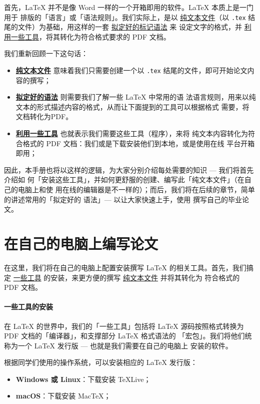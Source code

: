 首先，\LaTeX{} 并不是像 Word 一样的一个开箱即用的软件。\LaTeX{} 本质上是一门用于
排版的「语言」或「语法规则」。我们实际上，是以 \underline{纯文本文件}（以
\texttt{.tex} 结尾的文件）为基础，用这样的一套 \underline{拟定好的标记语法} 来
设定文字的格式，并 \underline{利用一些工具}，将其转化为符合格式要求的 PDF 文档。

我们重新回顾一下这句话：

\begin{itemize}[noitemsep]
  \item \textbf{\underline{纯文本文件}} 意味着我们只需要创建一个以 \texttt{.tex}
  结尾的文件，即可开始论文内容的撰写；
  \item \textbf{\underline{拟定好的语法}} 则需要我们了解一些 \LaTeX{} 中常用的语
  法语言规则，用来以纯文本的形式描述内容的格式，从而让下面提到的工具可以根据格式
  需要，将文档转化为PDF。
  \item \textbf{\underline{利用一些工具}} 也就表示我们需要这些工具（程序），来将
  纯文本内容转化为符合格式的 PDF 文档：我们或是下载安装他们到本地，或是使用在线
  平台开箱即用；
\end{itemize}

因此，本手册也将以这样的逻辑，为大家分别介绍每处需要的知识 --- 我们将首先介绍如
何「安装这些工具」，并如何更舒服的创建、编写此「纯文本文件」（在自己的电脑上和使
用在线的编辑器是不一样的）；而后，我们将在后续的章节，简单的讲述常用的「拟定好的
语法」--- 以让大家快速上手，使用 \BIThesis{} 撰写自己的毕业论文。

\section{在自己的电脑上编写论文}

在这里，我们将在自己的电脑上配置安装撰写 \LaTeX{} 的相关工具。首先，我们搞定
\underline{一些工具} 的安装，来更方便的撰写 \underline{纯文本文件} 并将其转化为
符合格式的 PDF 文档。

\paragraph{一些工具的安装} 在 \LaTeX{} 的世界中，我们的「一些工具」包括将
\LaTeX{} 源码按照格式转换为 PDF 文档的「编译器」，和支撑部分 \LaTeX{} 格式语法的
「宏包」。我们将他们统称为一个 \LaTeX{} 发行版 --- 也就是我们需要在自己的电脑上
安装的软件。

根据同学们使用的操作系统，可以安装相应的 \LaTeX{} 发行版：

\begin{itemize}[noitemsep]
  \item \textbf{Windows 或 Linux}：下载安装 \TeX{}Live；
  \item \textbf{macOS}：下载安装 Mac\TeX{}；
\end{itemize}

